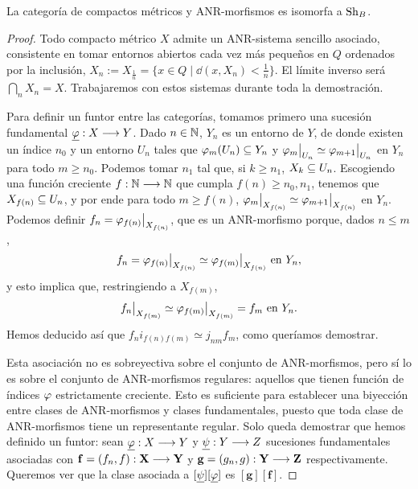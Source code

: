 \begin{theorem}
  La categoría de compactos métricos y ANR-morfismos es isomorfa a $ \operatorname{Sh}_B  $.
\end{theorem}
\begin{proof}
  Todo compacto métrico $ X  $ admite un ANR-sistema sencillo asociado, consistente en tomar entornos abiertos cada vez más peque\~nos en $ Q  $ ordenados por la inclusión, $ X_n := X_{\frac{1}{n}} = \{x\in Q\mid \dd(x,X_n)<\frac{1}{n}\} $. El límite inverso será $ \bigcap_n X_n = X  $. Trabajaremos con estos sistemas durante toda la demostración. 

  Para definir un funtor entre las categorías, tomamos primero una sucesión fundamental $ \underline{\varphi}:X\longrightarrow Y  $. Dado $ n\in \mathbb{N} $, $ Y_n  $ es un entorno de $ Y  $, de donde existen un índice $ n_0 $ y un entorno $ U_n  $ tales que $ \varphi_m (U_n)\subseteq Y_n  $ y $ \rest{\vf_m}{U_n }\simeq \rest{\vf_{m+1}}{U_n } $ en $ Y_n  $ para todo $ m\geq n_0  $. Podemos tomar $ n_1  $ tal que, si $ k\geq n_1  $, $ X_k\subseteq U_n  $. Escogiendo una función creciente $ f:\mathbb{N} \longrightarrow \mathbb{N}  $ que cumpla $ f(n)\geq n_0,n_1 $, tenemos que $ X_{f(n)}\subseteq U_n  $, y por ende para todo $m\geq f(n)  $, $ \rest{\vf_m }{X_{f(n)}}\simeq \rest{\vf_{m+1}}{X_{f(n)}} $ en $ Y_n  $. Podemos definir $ f_n = \rest{\vf_{f(n)}}{X_{f(n)}} $, que es un ANR-morfismo porque, dados $ n\leq m  $, 
  \begin{gather*}
    f_n = \rest{\vf_{f(n)}}{X_{f(n)}} \simeq \rest{\vf_{f(m)} }{X_{f(n )}} \text{ en } Y_n, 
  \end{gather*}
  y esto implica que, restringiendo a $ X_{f(m)} $, 
  \begin{gather*}
    \rest{f_n }{X_{f(m)}} \simeq \rest{\vf_{f(m)} }{X_{f(m )}}  = f_m \text{ en } Y_n.
  \end{gather*} 
  Hemos deducido así que $ f_n i_{f(n)f(m)} \simeq j_{nm} f_{m} $, como queríamos demostrar.

  Esta asociación no es sobreyectiva sobre el conjunto de ANR-morfismos, pero sí lo es sobre el conjunto de ANR-morfismos regulares: aquellos que tienen función de índices $ \varphi  $ estrictamente creciente. Esto es suficiente para establecer una biyección entre clases de ANR-morfismos y clases fundamentales, puesto que toda clase de ANR-morfismos tiene un representante regular. Solo queda demostrar que hemos definido un funtor: sean $ \underline{\varphi}:X\longrightarrow Y  $ y $ \underline{\psi }:Y\longrightarrow Z  $ sucesiones fundamentales asociadas con $ \mathbf{f} = (f_n,f):\mathbf{X}\longrightarrow \mathbf{Y} $ y $ \mathbf{g}=(g_n,g):\mathbf{Y}\longrightarrow \mathbf{Z} $ respectivamente. Queremos ver que la clase asociada a $ [\underline{\psi }][\underline{\varphi }] $ es $ [\mathbf{g}][\mathbf{f}] $. 
  

\end{proof}
